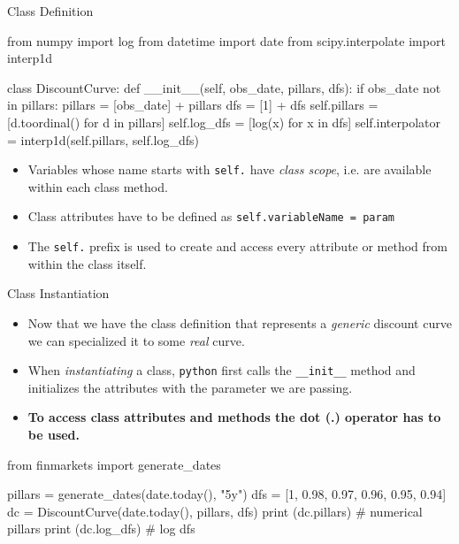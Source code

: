 \documentclass{beamer}
\begin{document}
\begin{frame}[fragile]{Class Definition}
\begin{ipython}
from numpy import log
from datetime import date
from scipy.interpolate import interp1d  
	
class DiscountCurve:
    def __init__(self, obs_date, pillars, dfs):
        if obs_date not in pillars:
            pillars = [obs_date] + pillars
            dfs = [1] + dfs
        self.pillars = [d.toordinal() for d in pillars]
        self.log_dfs = [log(x) for x in dfs]
        self.interpolator = interp1d(self.pillars, self.log_dfs)
\end{ipython}
\begin{itemize}
\item Variables whose name starts with \texttt{self.} have \emph{class scope}, i.e. are available within each class method.
\item Class attributes have to be defined as \texttt{self.variableName = param}
\item The \texttt{self.} prefix is used to create and access every attribute or method from within the class itself.
\end{itemize}
\end{frame}

\begin{frame}[fragile]{Class Instantiation}
  \begin{itemize}
  \item Now that we have the class definition that represents a \emph{generic} discount curve we can specialized it to some \emph{real} curve.
  \item When \emph{instantiating} a class, \texttt{python} first calls the \texttt{\_\_init\_\_} method and initializes the attributes with the parameter we are passing.
  \item \textbf{To access class attributes and methods the dot (.) operator has to be used.}
  \end{itemize}
\begin{ipython}
from finmarkets import generate_dates
			
pillars = generate_dates(date.today(), "5y")
dfs = [1, 0.98, 0.97, 0.96, 0.95, 0.94]      
dc = DiscountCurve(date.today(), pillars, dfs)
print (dc.pillars) # numerical pillars
print (dc.log_dfs) # log dfs
\end{ipython}
\begin{ioutput}
[738755 738761 739127 739492 739857 740222 740588]
[ 0.          0.         -0.02020271 -0.03045921 -0.04082199 -0.05129329
 -0.0618754 ]
\end{ioutput}
\end{frame}
\end{document}
